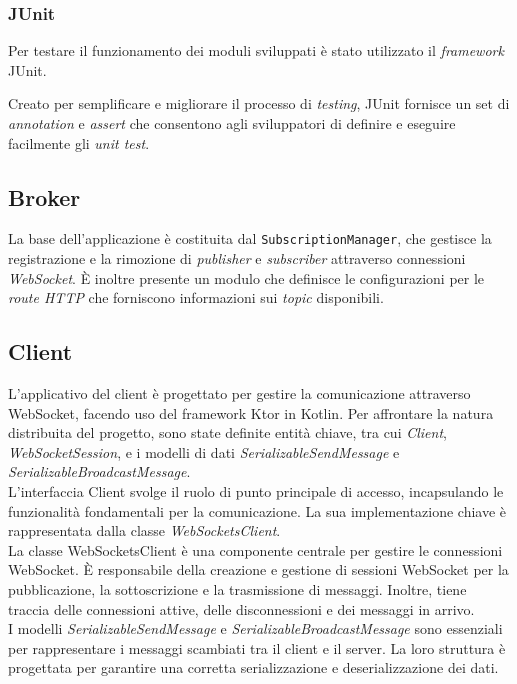 \subsubsection{JUnit}

Per testare il funzionamento dei moduli sviluppati è stato utilizzato il \textit{framework} JUnit\cite{junit}.

Creato per semplificare e migliorare il processo di \textit{testing}, JUnit fornisce un set di \textit{annotation} e \textit{assert} che consentono agli sviluppatori di definire e eseguire facilmente gli \textit{unit test}.

\subsection{Broker}
La base dell'applicazione è costituita dal \texttt{SubscriptionManager}, che gestisce la registrazione e la rimozione di \textit{publisher} e \textit{subscriber} attraverso connessioni \textit{WebSocket}. È inoltre presente un modulo che definisce le configurazioni per le \textit{route HTTP} che forniscono informazioni sui \textit{topic} disponibili.

\subsection{Client}
L'applicativo del client è progettato per gestire la comunicazione attraverso WebSocket,
facendo uso del framework Ktor in Kotlin. Per affrontare la natura distribuita del progetto,
sono state definite entità chiave, tra cui \textit{Client}, \textit{WebSocketSession}, e i modelli di dati
\textit{SerializableSendMessage} e \textit{SerializableBroadcastMessage}. \\

L'interfaccia Client svolge il ruolo di punto principale di accesso, incapsulando le funzionalità fondamentali per la
comunicazione. La sua implementazione chiave è rappresentata dalla classe \textit{WebSocketsClient}.\\

La classe WebSocketsClient è una componente centrale per gestire le connessioni WebSocket.
È responsabile della creazione e gestione di sessioni WebSocket per la pubblicazione,
la sottoscrizione e la trasmissione di messaggi. Inoltre, tiene traccia delle connessioni attive, delle disconnessioni e dei messaggi in arrivo.\\

I modelli \textit{SerializableSendMessage} e \textit{SerializableBroadcastMessage} sono essenziali per rappresentare i messaggi scambiati tra il client e
il server. La loro struttura è progettata per garantire una corretta serializzazione e deserializzazione dei dati. \\

